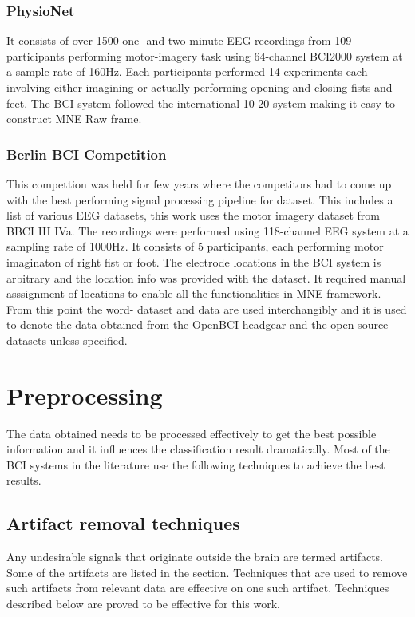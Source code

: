 \subsubsection{PhysioNet}
    It consists of over 1500 one- and two-minute EEG recordings from 109 participants performing motor-imagery task using 64-channel BCI2000 system at a sample rate of 160Hz. Each participants performed 14 experiments each involving either imagining or actually performing opening and closing fists and feet. The BCI system followed the international 10-20 system making it easy to construct MNE Raw frame.

\subsubsection{Berlin BCI Competition}
    This compettion was held for few years where the competitors had to come up with the best performing signal processing pipeline for dataset. This includes a list of various EEG datasets, this work uses the motor imagery dataset from BBCI III IVa. The recordings were performed using 118-channel EEG system at a sampling rate of 1000Hz. It consists of 5 participants, each performing motor imaginaton of right fist or foot. The electrode locations in the BCI system is arbitrary and the location info was provided with the dataset. It required manual asssignment of locations to enable all the functionalities in MNE framework. From this point the word- dataset and data are used interchangibly and it is used to denote the data obtained from the OpenBCI headgear and the open-source datasets unless specified.

\section{Preprocessing}
The data obtained needs to be processed effectively to get the best possible information and it influences the classification result dramatically. Most of the BCI systems in the literature use the following techniques to achieve the best results. 

\subsection{Artifact removal techniques}
    Any undesirable signals that originate outside the brain  are termed artifacts. Some of the artifacts are listed in the section. Techniques that are used to remove such artifacts from relevant data are effective on one such artifact. Techniques described below are proved to be effective for this work. 

